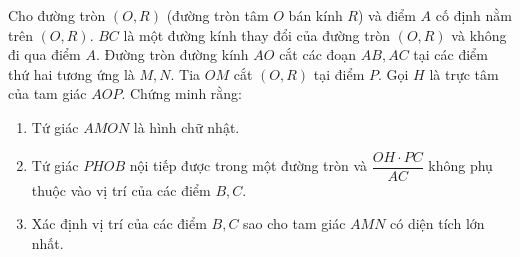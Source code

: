 \begin{bt}%
Cho đường tròn $\left(O,R\right)$ (đường tròn tâm $O$ bán kính $R$) và điểm $A$ cố định nằm trên $\left(O,R\right)$. $BC$ là một đường kính thay đổi của đường tròn $\left(O,R\right)$ và không đi qua điểm $A$. Đường tròn đường kính $AO$ cắt các đoạn $AB, AC$ tại các điểm thứ hai tương ứng là $M, N$. Tia $OM$ cắt $\left(O,R\right)$ tại điểm $P$. Gọi $H$ là trực tâm của tam giác $AOP$. Chứng minh rằng:
\begin{enumerate}
\item 
	Tứ giác $AMON$ là hình chữ nhật.
\item 
	Tứ giác $PHOB$ nội tiếp được trong một đường tròn và $\dfrac{OH\cdot PC}{AC}$ không phụ thuộc vào vị trí của các điểm $B, C$.
\item
	 Xác định vị trí của các điểm $B,C$ sao cho tam giác $AMN$ có diện tích lớn nhất.
\end{enumerate}		
\end{bt}
